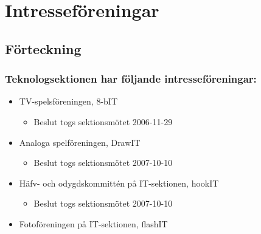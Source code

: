 \section{Intresseföreningar}

\subsection{Förteckning}

\subsubsection{Teknologsektionen har följande intresseföreningar:}

\begin{itemize}
	\item TV-spelsföreningen, 8-bIT
	\begin{itemize} 
		\item Beslut togs sektionsmötet 2006-11-29
	\end{itemize}
	\item Analoga spelföreningen, DrawIT
	\begin{itemize} 
		\item Beslut togs sektionsmötet 2007-10-10
	\end{itemize}
	\item Häfv- och odygdskommittén på IT-sektionen, hookIT
	\begin{itemize} 
		\item Beslut togs sektionsmötet 2007-10-10
	\end{itemize}
	\item Fotoföreningen på IT-sektionen, flashIT
\end{itemize}